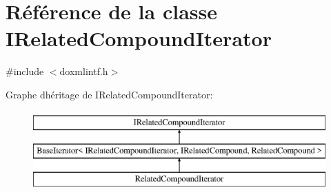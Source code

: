 \hypertarget{class_i_related_compound_iterator}{}\section{Référence de la classe I\+Related\+Compound\+Iterator}
\label{class_i_related_compound_iterator}


{\ttfamily \#include $<$doxmlintf.\+h$>$}

Graphe d\textquotesingle{}héritage de I\+Related\+Compound\+Iterator\+:\begin{figure}[H]
\begin{center}
\leavevmode
\includegraphics[height=3.000000cm]{class_i_related_compound_iterator}
\end{center}
\end{figure}

